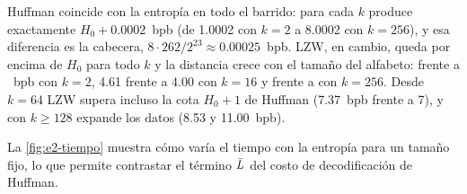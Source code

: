 
Huffman coincide con la entropía en todo el barrido: para cada $k$ produce exactamente
$H_0 + 0.0002$~bpb (de 1.0002 con $k = 2$ a 8.0002 con $k = 256$), y esa diferencia es la
cabecera, $8 \cdot 262 / 2^{23} \approx 0.00025$~bpb. LZW, en cambio, queda por encima de $H_0$
para todo $k$ y la distancia crece con el tamaño del alfabeto: \resEntropyLzwBpbKTwo{} frente a
\resEntropyHuffBpbKTwo{}~bpb con $k = 2$, 4.61 frente a 4.00 con $k = 16$ y
\resEntropyLzwBpbKTwoFiftySix{} frente a \resEntropyHuffBpbKTwoFiftySix{} con $k = 256$. Desde
$k = 64$ LZW supera incluso la cota $H_0 + 1$ de Huffman (7.37~bpb frente a 7), y con
$k \ge 128$ expande los datos (8.53 y 11.00~bpb).

La \cref{fig:e2-tiempo} muestra cómo varía el tiempo con la entropía para un tamaño fijo, lo
que permite contrastar el término $\bar{L}$ del costo de decodificación de Huffman.

